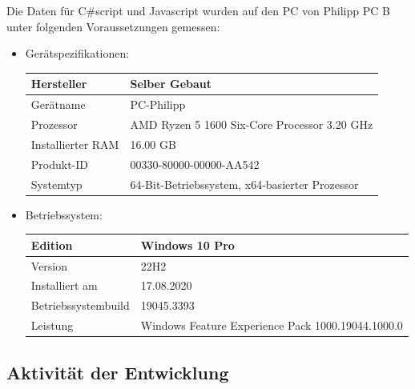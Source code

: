 \newpage
Die Daten für C\#script und Javascript wurden auf den PC von Philipp
PC B unter folgenden Voraussetzungen  gemessen:
\begin{itemize}
    \item Gerätspezifikationen:
    \begin{table}[H]
        \center
        \begin{tabular}{|p{3cm}|p{3cm}|}
            \hline
            Hersteller & Selber Gebaut \\ \hline
            Gerätname & PC-Philipp \\ \hline
            Prozessor & AMD Ryzen 5 1600 Six-Core Processor 3.20 GHz \\ \hline
            Installierter RAM & 16.00 GB \\ \hline
            Produkt-ID & 00330-80000-00000-AA542 \\ \hline
            Systemtyp & 64-Bit-Betriebssystem, x64-basierter Prozessor \\ \hline
        \end{tabular}
    \end{table}
    \item Betriebssystem:
    \begin{table}[H]
        \center
        \begin{tabular}{|p{4cm}|p{4cm}|}
            \hline
            Edition & Windows 10 Pro \\ \hline
            Version & 22H2 \\ \hline
            Installiert am & 17.08.2020 \\ \hline
            Betriebssystembuild & 19045.3393 \\ \hline
            Leistung & Windows Feature Experience Pack 1000.19044.1000.0 \\ \hline
        \end{tabular}        
    \end{table}
\end{itemize}


\newpage
\subsection{Aktivität der Entwicklung}

